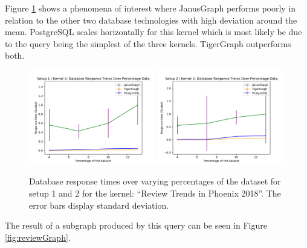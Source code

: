 Figure \ref{fig:reviewPerfResults} shows a phenomena of interest where JanusGraph performs poorly in relation to the other two database technologies with high deviation around the mean. PostgreSQL scales horizontally for this kernel which is most likely be due to the query being the simplest of the three kernels. TigerGraph outperforms both.

\begin{figure}[h]
    \centering
    \includegraphics[width=0.49\textwidth]{img/perfResults/reviewsPlotSetup1.pdf}
    \includegraphics[width=0.49\textwidth]{img/perfResults/reviewsPlotSetup2.pdf}
    \caption{Database response times over varying percentages of the dataset for setup 1 and 2 for the kernel: ``Review Trends in Phoenix 2018''. The error bars display standard deviation.}
    \label{fig:reviewPerfResults}
\end{figure}


The result of a subgraph produced by this query can be seen in Figure \ref{fig:reviewGraph}.

